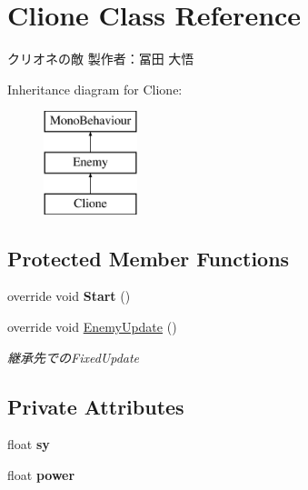\hypertarget{class_clione}{}\section{Clione Class Reference}
\label{class_clione}


クリオネの敵 製作者：冨田 大悟  


Inheritance diagram for Clione\+:\begin{figure}[H]
\begin{center}
\leavevmode
\includegraphics[height=3.000000cm]{class_clione}
\end{center}
\end{figure}
\subsection*{Protected Member Functions}
\begin{DoxyCompactItemize}
\item 
\mbox{\label{class_clione_acf8d1be4d27c8ab10f6cca89d2d873b8}} 
override void {\bfseries Start} ()
\item 
override void \hyperlink{class_clione_a59ce5c64ae6b106a6ef39dd5773ebafc}{Enemy\+Update} ()
\begin{DoxyCompactList}\small\item\em 継承先での\+Fixed\+Update \end{DoxyCompactList}\end{DoxyCompactItemize}
\subsection*{Private Attributes}
\begin{DoxyCompactItemize}
\item 
\mbox{\label{class_clione_a6e703890c266a13730d9f456dddcc6d4}} 
float {\bfseries sy}
\item 
\mbox{\label{class_clione_ae7ca26f8e686e5901d60ce9d6886e767}} 
float {\bfseries power}
\end{DoxyCompactItemize}
